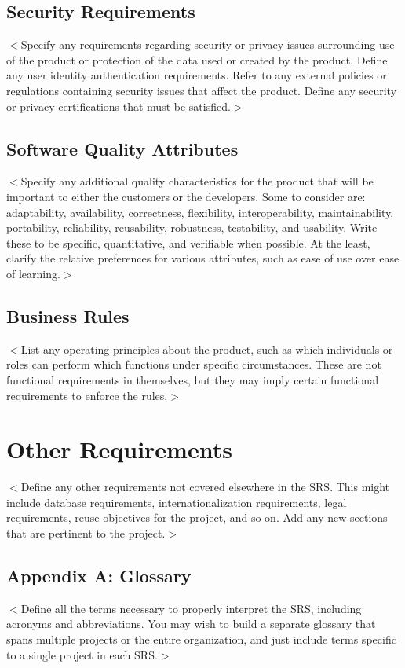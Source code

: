 \documentclass{scrreprt}
\begin{document}
\section{Security Requirements}
$<$Specify any requirements regarding security or privacy issues surrounding use 
of the product or protection of the data used or created by the product. Define 
any user identity authentication requirements. Refer to any external policies or 
regulations containing security issues that affect the product. Define any 
security or privacy certifications that must be satisfied.$>$

\section{Software Quality Attributes}
$<$Specify any additional quality characteristics for the product that will be 
important to either the customers or the developers. Some to consider are: 
adaptability, availability, correctness, flexibility, interoperability, 
maintainability, portability, reliability, reusability, robustness, testability, 
and usability. Write these to be specific, quantitative, and verifiable when 
possible. At the least, clarify the relative preferences for various attributes, 
such as ease of use over ease of learning.$>$

\section{Business Rules}
$<$List any operating principles about the product, such as which individuals or 
roles can perform which functions under specific circumstances. These are not 
functional requirements in themselves, but they may imply certain functional 
requirements to enforce the rules.$>$


\chapter{Other Requirements}
$<$Define any other requirements not covered elsewhere in the SRS. This might 
include database requirements, internationalization requirements, legal 
requirements, reuse objectives for the project, and so on. Add any new sections 
that are pertinent to the project.$>$

\section{Appendix A: Glossary}
$<$Define all the terms necessary to properly interpret the SRS, including 
acronyms and abbreviations. You may wish to build a separate glossary that spans 
multiple projects or the entire organization, and just include terms specific to 
a single project in each SRS.$>$
\end{document}
